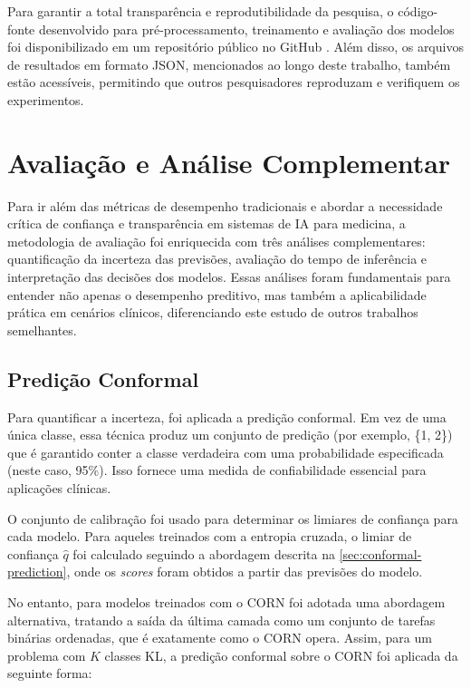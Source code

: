 Para garantir a total transparência e reprodutibilidade da pesquisa, o código-fonte desenvolvido para pré-processamento, treinamento e avaliação dos modelos foi disponibilizado em um repositório público no GitHub \cite{github-repo}. Além disso, os arquivos de resultados em formato JSON, mencionados ao longo deste trabalho, também estão acessíveis, permitindo que outros pesquisadores reproduzam e verifiquem os experimentos.

\section{Avaliação e Análise Complementar}

Para ir além das métricas de desempenho tradicionais e abordar a necessidade crítica de confiança e transparência em sistemas de IA para medicina, a metodologia de avaliação foi enriquecida com três análises complementares: quantificação da incerteza das previsões, avaliação do tempo de inferência e interpretação das decisões dos modelos. Essas análises foram fundamentais para entender não apenas o desempenho preditivo, mas também a aplicabilidade prática em cenários clínicos, diferenciando este estudo de outros trabalhos semelhantes.

\subsection{Predição Conformal}

Para quantificar a incerteza, foi aplicada a predição conformal. Em vez de uma única classe, essa técnica produz um conjunto de predição (por exemplo, \{1, 2\}) que é garantido conter a classe verdadeira com uma probabilidade especificada (neste caso, 95\%). Isso fornece uma medida de confiabilidade essencial para aplicações clínicas.

O conjunto de calibração foi usado para determinar os limiares de confiança para cada modelo. Para aqueles treinados com a entropia cruzada, o limiar de confiança $\hat{q}$ foi calculado seguindo a abordagem descrita na \autoref{sec:conformal-prediction}, onde os \textit{scores} foram obtidos a partir das previsões do modelo.

No entanto, para modelos treinados com o CORN foi adotada uma abordagem alternativa, tratando a saída da última camada como um conjunto de tarefas binárias ordenadas, que é exatamente como o CORN opera. Assim, para um problema com $K$ classes KL, a predição conformal sobre o CORN foi aplicada da seguinte forma:

